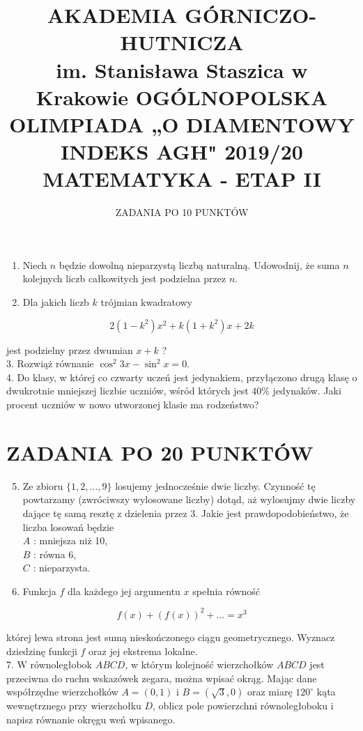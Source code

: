 \documentclass[10pt]{article}
\title{AKADEMIA GÓRNICZO-HUTNICZA \\
 im. Stanisława Staszica w Krakowie OGÓLNOPOLSKA OLIMPIADA „O DIAMENTOWY INDEKS AGH" 2019/20 MATEMATYKA - ETAP II }
\author{ZADANIA PO 10 PUNKTÓW}
\date{}
\begin{document}
\maketitle


\begin{enumerate}
  \item Niech $n$ będzie dowolną nieparzystą liczbą naturalną. Udowodnij, że suma $n$ kolejnych liczb całkowitych jest podzielna przez $n$.
  \item Dla jakich liczb $k$ trójmian kwadratowy
\end{enumerate}

$$
2\left(1-k^{2}\right) x^{2}+k\left(1+k^{2}\right) x+2 k
$$

jest podzielny przez dwumian $x+k$ ?\\
3. Rozwiąż równanie $\cos ^{2} 3 x-\sin ^{2} x=0$.\\
4. Do klasy, w której co czwarty uczeń jest jedynakiem, przyłączono drugą klasę o dwukrotnie mniejszej liczbie uczniów, wśród których jest $40 \%$ jedynaków. Jaki procent uczniów w nowo utworzonej klasie ma rodzeństwo?

\section*{ZADANIA PO 20 PUNKTÓW}
\begin{enumerate}
  \setcounter{enumi}{4}
  \item Ze zbioru $\{1,2, \ldots, 9\}$ losujemy jednocześnie dwie liczby. Czynność tę powtarzamy (zwróciwszy wylosowane liczby) dotąd, aż wylosujmy dwie liczby dające tę samą resztę z dzielenia przez 3. Jakie jest prawdopodobieństwo, że liczba losowań będzie\\
$A$ : mniejsza niż 10,\\
$B$ : równa 6,\\
$C$ : nieparzysta.
  \item Funkcja $f$ dla każdego jej argumentu $x$ spełnia równość
\end{enumerate}

$$
f(x)+(f(x))^{2}+\ldots=x^{3}
$$

której lewa strona jest sumą nieskończonego ciągu geometrycznego. Wyznacz dziedzinę funkcji $f$ oraz jej ekstrema lokalne.\\
7. W równoległobok $A B C D$, w którym kolejność wierzchołków $A B C D$ jest przeciwna do ruchu wskazówek zegara, można wpisać okrąg. Mając dane współrzędne wierzchołków $A=(0,1)$ i $B=(\sqrt{3}, 0)$ oraz miarę $120^{\circ}$ kąta wewnętrznego przy wierzchołku $D$, oblicz pole powierzchni równoległoboku i napisz równanie okręgu weń wpisanego.
\end{document}
